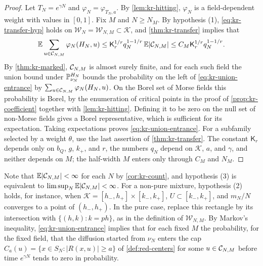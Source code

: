 \begin{proof}
Let $T_N=e^{\gamma N}$ and $\varphi_N=\varphi_{T_N,a}$. By \cref{lem:kr-hitting}, $\varphi_N$ is a field-dependent weight with values in $[0,1]$. Fix $M$ and $N\ge N_M$. By hypothesis (1), \eqref{eq:kr-transfer-hyp} holds on $\mathcal W_N=\mathcal W_{N,M}\subset\mathcal K$, and \cref{thm:kr-transfer} implies that
\[
\mathbb E\sum_{u\in\mathcal C_{N,M}}\varphi_N(H_N,u)\le\mathsf K_r^{1/r}q_N^{1-1/r}\,\mathbb E|\mathcal C_{N,M}|\le C_M\mathsf K_r^{1/r}q_N^{1-1/r}.
\]
By \cref{thm:kr-marked}, $\mathcal C_{N,M}$ is almost surely finite, and for each such field the union bound under $\mathbb P^{H_N}_{\nu_N}$ bounds the probability on the left of \eqref{eq:kr-union-entrance} by $\sum_{u\in\mathcal C_{N,M}}\varphi_N(H_N,u)$. On the Borel set of Morse fields this probability is Borel, by the enumeration of critical points in the proof of \cref{prop:kr-coefficient} together with \cref{lem:kr-hitting}. Defining it to be zero on the null set of non-Morse fields gives a Borel representative, which is sufficient for its expectation. Taking expectations proves \eqref{eq:kr-union-entrance}. For a subfamily selected by a weight $\theta$, use the last assertion of \cref{thm:kr-transfer}. The constant $\mathsf K_r$ depends only on $b_Q$, $g$, $k_+$, and $r$, the numbers $q_N$ depend on $\mathcal K$, $a$, and $\gamma$, and neither depends on $M$; the half-width $M$ enters only through $C_M$ and $N_M$.
\end{proof}

Note that $\mathbb E|\mathcal C_{N,M}|<\infty$ for each $N$ by \cref{cor:kr-count}, and hypothesis (3) is equivalent to $\limsup_N\mathbb E|\mathcal C_{N,M}|<\infty$. For a non-pure mixture, hypothesis (2) holds, for instance, when $\mathcal K=[h_-,h_+]\times[k_-,k_+]$, $U\subset[k_-,k_+]$, and $m_N/N$ converges to a point of $(h_-,h_+)$. In the pure case, replace this rectangle by its intersection with $\{(h,k):k=ph\}$, as in the definition of $\mathcal W_{N,M}$. By Markov's inequality, \eqref{eq:kr-union-entrance} implies that for each fixed $M$ the probability, for the fixed field, that the diffusion started from $\nu_N$ enters the cap $C_a(u)=\{x\in S_N:|R(x,u)|\ge a\}$ of \cref{def:red-centers} for some $u\in\mathcal C_{N,M}$ before time $e^{\gamma N}$ tends to zero in probability.

